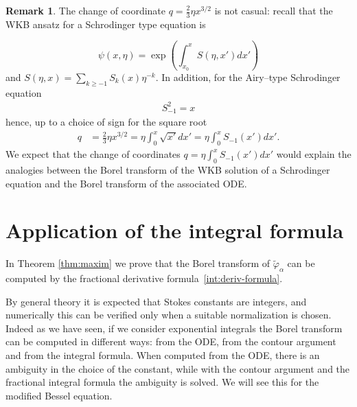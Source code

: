\documentclass{article}
\theoremstyle{definition}
\newtheorem{remark}[definition]{Remark}
\begin{document}
\begin{remark}
The change of coordinate $q=\frac{2}{3}\eta x^{3/2}$ is not casual: recall that the WKB ansatz for a Schrodinger type equation is

\begin{equation}
\psi(x,\eta)=\exp\left(\int_{x_0}^xS(\eta,x')dx'\right)
\end{equation} 
 and $S(\eta,x)=\sum_{k\geq -1}S_k(x)\eta^{-k}$. In addition, for the Airy--type Schrodinger equation 
 \begin{align*}
 S_{-1}^2=x
 \end{align*}
hence, up to a choice of sign for the square root
\begin{align*}
q&=\frac{2}{3}\eta x^{3/2}=\eta\int_0^x\sqrt{x'}dx'=\eta\int_{0}^xS_{-1}(x')dx'.
\end{align*}
We expect that the change of coordinates $q=\eta\int_0^{x}S_{-1}(x')dx'$ would explain the analogies between the Borel transform of the WKB solution of a Schrodinger equation and the Borel transform of the associated ODE.  
\end{remark} 

\section{Application of the integral formula}

In Theorem \eqref{thm:maxim} we prove that the Borel transform of $\tilde{\varphi}_{\alpha}$ can be computed by the fractional derivative formula~\eqref{int:deriv-formula}. \color{olive} 


By general theory it is expected that Stokes constants are integers, and numerically this can be verified only when a suitable normalization is chosen. Indeed as we have seen, if we consider exponential integrals the Borel transform can be computed in different ways: from the ODE, from the contour argument and from the integral formula. When computed from the ODE, there is an ambiguity in the choice of the constant, while with the contour argument and the fractional integral formula the ambiguity is solved. We will see this for the modified Bessel equation. 
\end{document}
